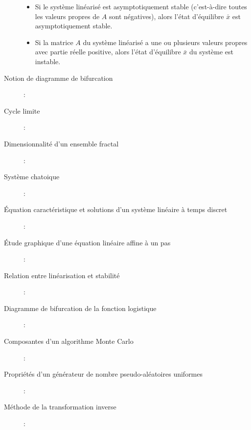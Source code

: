 \documentclass[a4paper]{article}
\begin{document}
\begin{description}
\begin{itemize}
			\item Si le système linéarisé est asymptotiquement stable
				(c'est-à-dire toutes les valeurs propres de \(A\) sont négatives),
				alors l'état d'équilibre \(\bar x\) est asymptotiquement stable.
			\item Si la matrice \(A\) du système linéarisé a une ou plusieurs valeurs
			propres avec partie réelle positive, alors l'état d'équilibre \(\bar x\)
			du système est instable.
		\end{itemize}
	\item [Notion de diagramme de bifurcation]:\\
	\item [Cycle limite]:\\
	\item [Dimensionnalité d'un ensemble fractal]:\\
	\item [Système chatoique]:\\
	\item [Équation caractéristique et solutions d'un système linéaire à temps
discret]:\\
	\item [Étude graphique d'une équation linéaire affine à un pas]:\\
	\item [Relation entre linéarisation et stabilité]:\\
	\item [Diagramme de bifurcation de la fonction logistique]:\\
	\item [Composantes d'un algorithme Monte Carlo]:\\
	\item [Propriétés d'un générateur de nombre pseudo-aléatoires uniformes]:\\
	\item [Méthode de la transformation inverse]:\\
\end{description}
\end{document}
